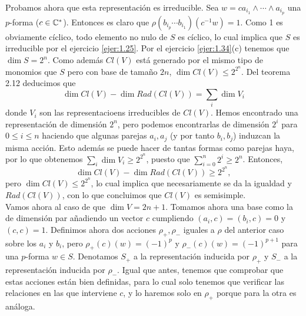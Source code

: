 \documentclass[twoside]{article}
\begin{document}
\begin{enumerate}
Probamos ahora que esta representación es irreducible. Sea $w=ca_{i_1}\land\cdots\land a_{i_p}$ una $p$-forma ($c\in\mathbb{C}^*$). Entonces es claro que $\rho(b_{i_p}\cdots b_{i_1})(c^{-1}w)=1$. Como 1 es obviamente cíclico, todo elemento no nulo de $S$ es cíclico, lo cual implica que $S$ es irreducible por el ejercicio \ref{ejer:1.25}. Por el ejercicio \ref{ejer:1.34}(c) tenemos que $\dim S=2^n$. Como además $Cl(V)$ está generado por el mismo tipo de monomios que $S$ pero con base de tamaño $2n$, $\dim Cl(V)\leq 2^{2^n}$. Del teorema 2.12 deducimos que $$\dim Cl(V)-\dim Rad(Cl(V))=\sum_i\dim V_i$$ donde $V_i$ son las representacioens irreducibles de $Cl(V)$. Hemos encontrado una representación de dimensión $2^n$, pero podemos encontrarlas de dimensión $2^i$ para  $0\leq i\leq n$ haciendo que algunas parejas $a_i,a_j$ (y por tanto $b_i,b_j$) induzcan la misma acción. Esto además se puede hacer de tantas formas como parejas haya, por lo que obtenemos $\sum_i\dim V_i\geq 2^{2^n}$, puesto que $\sum_{i=0}^n2^i\geq 2^n$. Entonces, $$\dim Cl(V)-\dim Rad(Cl(V))\geq 2^{2^n},$$ pero $\dim Cl(V)\leq 2^{2^n}$, lo cual implica que necesariamente se da la igualdad y $Rad(Cl(V))$, con lo que concluimos que $Cl(V)$ es semisimple.\\

Vamos ahora al caso de que $\dim V=2n+1$. Tomamos ahora una base como la de dimensión par añadiendo un vector $c$ cumpliendo $(a_i,c)=(b_i,c)=0$ y $(c,c)=1$. Definimos ahora dos acciones $\rho_+,\rho_-$ iguales a $\rho$ del anterior caso sobre los $a_i$ y $b_i$, pero $\rho_+(c)(w)=(-1)^p$ y $\rho_-(c)(w)=(-1)^{p+1}$ para una $p$-forma $w\in S$. Denotamos $S_+$ a la representación inducida por $\rho_+$ y $S_-$ a la representación inducida por $\rho_-$. Igual que antes, tenemos que comprobar que estas acciones están bien definidas, para lo cual solo tenemos que verificar las relaciones en las que interviene $c$, y lo haremos solo en $\rho_+$ porque para la otra es análoga.


\end{enumerate}
\end{document}
